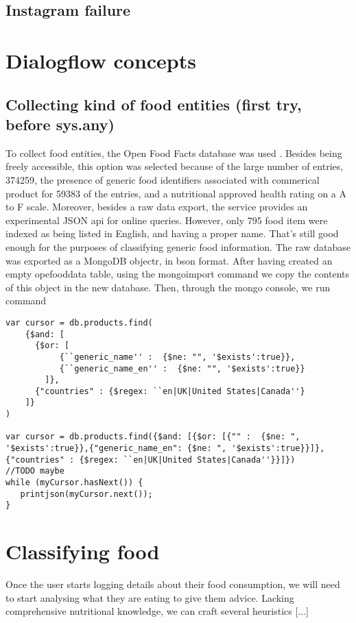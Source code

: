 \documentclass{article}
\begin{document}
\subsection*{Instagram failure}
\section*{Dialogflow concepts}
\subsection*{Collecting kind of food entities (first try, before sys.any)}
To collect food entities, the Open Food Facts database was used \cite{openfoodfacts}. Besides being freely accessible, this option was selected because of the large number of entries, 374259, the presence of generic food identifiers associated with commerical product for 59383 of the entries, and a nutritional approved health rating on a A to F scale. Moreover, besides a raw data export, the service provides an experimental JSON api for online queries. However, only 795 food item were indexed as being listed in English, and having a proper name. That's still good enough for the purposes of classifying generic food information.
The raw database was exported as a MongoDB \cite{mongo} objectr, in bson format. After having created an empty opefooddata table, using the mongoimport command we copy the contents of this object in the new database. Then, through the mongo console, we run command
\begin{lstlisting}
var cursor = db.products.find( 
    {$and: [
      {$or: [
           {``generic_name'' :  {$ne: "", '$exists':true}},
           {``generic_name_en'' :  {$ne: "", '$exists':true}}
        ]},
      {"countries" : {$regex: ``en|UK|United States|Canada''}
    ]}
)

var cursor = db.products.find({$and: [{$or: [{"" :  {$ne: ", '$exists':true}},{"generic_name_en": {$ne: ", '$exists':true}}]}, {"countries" : {$regex: ``en|UK|United States|Canada''}}]})
//TODO maybe 
while (myCursor.hasNext()) {
   printjson(myCursor.next());
}
\end{lstlisting}


\section*{Classifying food}
Once the user starts logging details about their food consumption, we will need to start analysing what they are eating to give them advice. Lacking comprehensive nutritional knowledge, we can craft several heuristics [...]
\end{document}
